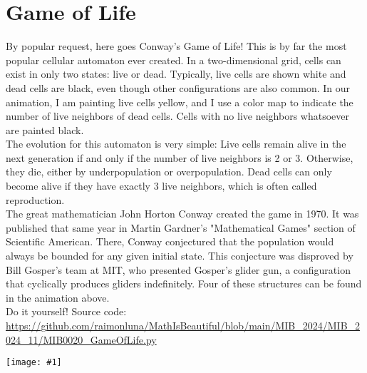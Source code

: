 \documentclass[12pt,landscape]{article}
\newcommand{\artpage}[3][]{%
  \begin{minipage}[t]{0.48\linewidth}
    \vspace{0pt} %
    \section*{#2} %
    \addcontentsline{toc}{section}{#2} %
    #3 %
  \end{minipage}%
  \hfill
  \begin{minipage}[t]{0.48\linewidth}
    \vspace{0pt} %
    \centering
    \texttt{[image: \#1]}
  \end{minipage}%
  \newpage
}
\begin{document}
\artpage[../Output/LowQuality/MIB0020_GameOfLife.png]{Game of Life}{%
By popular request, here goes Conway's Game of Life! This is by far the most popular cellular automaton ever created. In a two-dimensional grid, cells can exist in only two states: live or dead. Typically, live cells are shown white and dead cells are black, even though other configurations are also common. In our animation, I am painting live cells yellow, and I use a color map to indicate the number of live neighbors of dead cells. Cells with no live neighbors whatsoever are painted black.\\

The evolution for this automaton is very simple: Live cells remain alive in the next generation if and only if the number of live neighbors is 2 or 3. Otherwise, they die, either by underpopulation or overpopulation. Dead cells can only become alive if they have exactly 3 live neighbors, which is often called reproduction. \\

The great mathematician John Horton Conway created the game in 1970. It was published that same year in Martin Gardner's "Mathematical Games" section of Scientific American. There, Conway conjectured that the population would always be bounded for any given initial state. This conjecture was disproved by Bill Gosper's team at MIT, who presented Gosper's glider gun, a configuration that cyclically produces gliders indefinitely. Four of these structures can be found in the animation above.\\

Do it yourself! Source code: \url{https://github.com/raimonluna/MathIsBeautiful/blob/main/MIB_2024/MIB_2024_11/MIB0020_GameOfLife.py}
}
\end{document}
